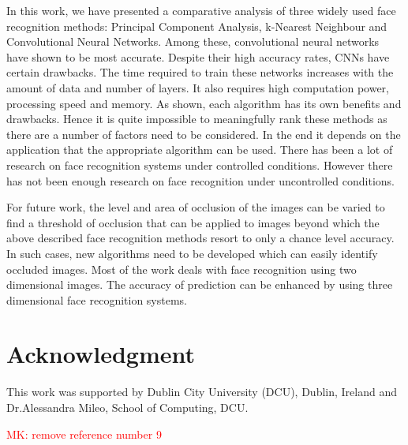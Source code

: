 \documentclass[conference]{IEEEtran}
\newcommand{\MK}[1]{\textcolor{red}{MK: #1}}  %
\begin{document}
In this work, we have presented a comparative analysis of three widely used face recognition methods: Principal Component Analysis, k-Nearest Neighbour and Convolutional Neural Networks. Among these, convolutional neural networks have shown to be most accurate. Despite their high accuracy rates, CNNs have certain drawbacks. The time required to train these networks increases with the amount of data and number of layers. It also requires high computation power, processing speed and memory. As shown, each algorithm has its own benefits and drawbacks. Hence it is quite impossible to meaningfully rank these methods as there are a number of factors need to be considered. In the end it depends on the application that the appropriate algorithm can be used. There has been a lot of research on face recognition systems under controlled conditions. However there has not been enough research on face recognition under uncontrolled conditions.

For future work, the level and area of occlusion of the images can be varied to find a threshold of occlusion that can be applied to images beyond which the above described face recognition methods resort to only a chance level accuracy. In such cases, new algorithms need to be developed which can easily identify occluded images. Most of the work deals with face recognition using two dimensional images. The accuracy of prediction can be enhanced by using three dimensional face recognition systems. \cite{mileo2008wireless} 


\section*{Acknowledgment}
This work was supported by Dublin City University (DCU), Dublin, Ireland and Dr.Alessandra Mileo, School of Computing, DCU.

\MK{remove reference number 9}


\end{document}
